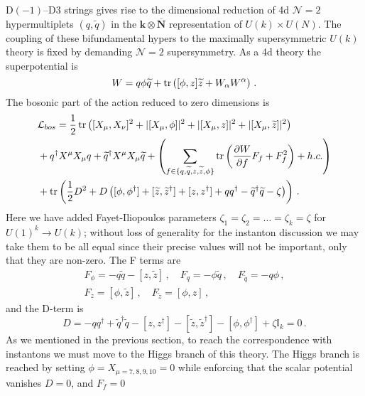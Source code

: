 \documentclass[main.tex]{subfiles}
\begin{document}
D$(-1)$--D$3$ strings gives rise to the dimensional reduction of 4d $\mathcal{N}=2$ hypermultiplets $(q,\widetilde{q})$ in the $\mathbf{k}\otimes\overline{\mathbf{N}}$ representation of $U(k)\times U(N)$.  The coupling of these bifundamental hypers to the maximally supersymmetric $U(k)$ theory is fixed by demanding $\mathcal{N}=2$ supersymmetry.  
As a 4d theory the superpotential is
\begin{equation}
W=q\phi \widetilde{q}+\operatorname{tr}\left([\phi,z]\widetilde{z}+ W_{\alpha}W^{\alpha}\right)\,.
\end{equation}
The bosonic part of the action reduced to zero dimensions is
\begin{equation}
\begin{aligned}
&\mathcal{L}_{bos}=\frac{1}{2}\operatorname{tr}\left([X_{\mu},X_{\nu}]^2+|[X_{\mu},\phi]|^2+|[X_{\mu},z]|^2+|[X_{\mu},\widetilde{z}]|^2\right)\\
&+q^{\dagger}X^{\mu}X_{\mu}q+\widetilde{q}^{\dagger}X^{\mu}X_{\mu}\widetilde{q}+\left(\sum_{f\in \{q,\widetilde{q},z,\widetilde{z},\phi\}}\operatorname{tr}\left(\frac{\partial W}{\partial f}F_f+F_f^2\right)+h.c.\right)\\
&+\operatorname{tr}\left(\frac{1}{2}D^2+D\left([\phi,\phi^{\dagger}]+[\widetilde{z},\widetilde{z}^{\dagger}]+[z,z^{\dagger}]+qq^{\dagger}-\widetilde{q}^{\dagger}\widetilde{q}-\zeta\right)\right)\,.
\end{aligned}
\end{equation}
Here we have added Fayet-Iliopoulos parameters $\zeta_{1}=\zeta_{2}=\dots=\zeta_{k}=\zeta$ for $U(1)^k\to U(k)$; without loss of generality for the instanton discussion we may take them to be all equal since their precise values will not be important, only that they are non-zero.
The F terms are
\begin{gather}
F_{\phi}=-q\widetilde{q}-[z,\widetilde{z}]\,,\quad F_{q}=-\phi\widetilde{q}\,,\quad F_{\widetilde{q}}=-q\phi\,,\\ F_{z}=[\phi,\widetilde{z}]\,,\quad F_{\widetilde{z}}=[\phi,z]\,,
\end{gather}
and the D-term is
\begin{equation}\label{eqn:Dterm}
D=-qq^{\dagger}+\widetilde{q}^{\dagger}\widetilde{q}-[z,z^{\dagger}]-[\widetilde{z},\widetilde{z}^{\dagger}]-[\phi,\phi^{\dagger}]+\zeta\mathbb{I}_k=0\,.
\end{equation}
As we mentioned in the previous section, to reach the correspondence with instantons we must move to the Higgs branch of this theory.  The Higgs branch is reached by setting $\phi=X_{\mu=7,8,9,10}=0$ while enforcing that the scalar potential vanishes $D=0$, and $F_f=0$
\end{document}
